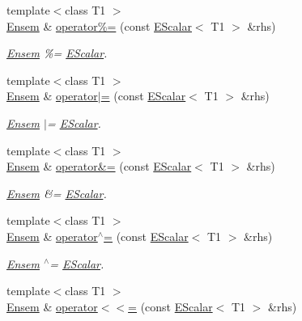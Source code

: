 \begin{DoxyCompactItemize}
{\footnotesize template$<$class T1 $>$ }\\\mbox{\hyperlink{classENSEM_1_1Ensem}{Ensem}} \& \mbox{\hyperlink{classENSEM_1_1Ensem_a8f910ad50fa1625b535bd2456aa7ad64}{operator\%=}} (const \mbox{\hyperlink{classENSEM_1_1EScalar}{E\+Scalar}}$<$ T1 $>$ \&rhs)
\begin{DoxyCompactList}\small\item\em \mbox{\hyperlink{classENSEM_1_1Ensem}{Ensem}} \%= \mbox{\hyperlink{classENSEM_1_1EScalar}{E\+Scalar}}. \end{DoxyCompactList}\item 
{\footnotesize template$<$class T1 $>$ }\\\mbox{\hyperlink{classENSEM_1_1Ensem}{Ensem}} \& \mbox{\hyperlink{classENSEM_1_1Ensem_aa0c3f80e393be46c6f0a1cb3bbdfb170}{operator$\vert$=}} (const \mbox{\hyperlink{classENSEM_1_1EScalar}{E\+Scalar}}$<$ T1 $>$ \&rhs)
\begin{DoxyCompactList}\small\item\em \mbox{\hyperlink{classENSEM_1_1Ensem}{Ensem}} $\vert$= \mbox{\hyperlink{classENSEM_1_1EScalar}{E\+Scalar}}. \end{DoxyCompactList}\item 
{\footnotesize template$<$class T1 $>$ }\\\mbox{\hyperlink{classENSEM_1_1Ensem}{Ensem}} \& \mbox{\hyperlink{classENSEM_1_1Ensem_ab5e9900522968210e53ec66b09a402fe}{operator\&=}} (const \mbox{\hyperlink{classENSEM_1_1EScalar}{E\+Scalar}}$<$ T1 $>$ \&rhs)
\begin{DoxyCompactList}\small\item\em \mbox{\hyperlink{classENSEM_1_1Ensem}{Ensem}} \&= \mbox{\hyperlink{classENSEM_1_1EScalar}{E\+Scalar}}. \end{DoxyCompactList}\item 
{\footnotesize template$<$class T1 $>$ }\\\mbox{\hyperlink{classENSEM_1_1Ensem}{Ensem}} \& \mbox{\hyperlink{classENSEM_1_1Ensem_a7f9a469a80ccb509892aef8d356fd81e}{operator$^\wedge$=}} (const \mbox{\hyperlink{classENSEM_1_1EScalar}{E\+Scalar}}$<$ T1 $>$ \&rhs)
\begin{DoxyCompactList}\small\item\em \mbox{\hyperlink{classENSEM_1_1Ensem}{Ensem}} $^\wedge$= \mbox{\hyperlink{classENSEM_1_1EScalar}{E\+Scalar}}. \end{DoxyCompactList}\item 
{\footnotesize template$<$class T1 $>$ }\\\mbox{\hyperlink{classENSEM_1_1Ensem}{Ensem}} \& \mbox{\hyperlink{classENSEM_1_1Ensem_a9aecabccdc31d9b43db877a82879f702}{operator$<$$<$=}} (const \mbox{\hyperlink{classENSEM_1_1EScalar}{E\+Scalar}}$<$ T1 $>$ \&rhs)

\end{DoxyCompactItemize}
